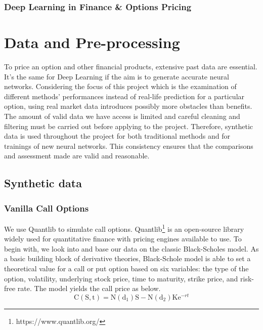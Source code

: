 \documentclass{report}
\begin{document}
\subsection{Deep Learning in Finance & Options Pricing}


\chapter{Data and Pre-processing}
To price an option and other financial products, extensive past data are essential. It's the same for Deep Learning if the aim is to generate accurate neural networks. Considering the focus of this project which is the examination of different methods' performances instead of real-life prediction for a particular option, using real market data introduces possibly more obstacles than benefits. The amount of valid data we have access is limited and careful cleaning and filtering must be carried out before applying to the project. Therefore, synthetic data is used throughout the project for both traditional methods and for trainings of new neural networks. This consistency ensures that the comparisons and assessment made are valid and reasonable.

\section{Synthetic data}

\subsection{Vanilla Call Options}
We use Quantlib to simulate call options. Quantlib\footnote{https://www.quantlib.org/} is an open-source library widely used for quantitative finance with pricing engines available to use. To begin with, we look into and base our data on the classic Black-Scholes model. As a basic building block of derivative theories, Black-Schole model is able to set a theoretical value for a call or put option based on six variables: the type of the option, volatility, underlying stock price, time to maturity, strike price, and risk-free rate. The model yields the call price as below.\\

\begin{equation}
\mathrm C(\mathrm S,\mathrm t)= \mathrm N(\mathrm d_1)\mathrm S - \mathrm N(\mathrm d_2) \mathrm K \mathrm e^{-rt}
\label{eq:2}
\end{equation}
\end{document}
